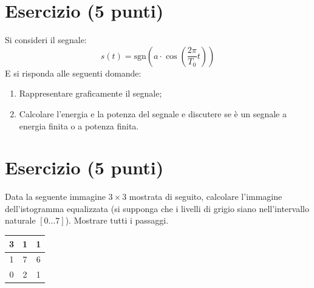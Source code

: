 \documentclass[a4paper]{article}
\begin{document}
	\section{Esercizio (5 punti)}
	
	Si consideri il segnale:
	\begin{equation*}
		s\left(t\right) = \mathrm{sgn}\left(a \cdot \cos\left(\dfrac{2\pi}{T_{0}}t\right)\right)
	\end{equation*}
	E si risponda alle seguenti domande:
	\begin{enumerate}
		\item Rappresentare graficamente il segnale;
		\item Calcolare l'energia e la potenza del segnale e discutere se è un segnale a energia finita o a potenza finita.
	\end{enumerate}
	
	\section{Esercizio (5 punti)}
	
	Data la seguente immagine $3 \times 3$ mostrata di seguito, calcolare l'immagine dell'istogramma equalizzata (si supponga che i livelli di grigio siano nell'intervallo naturale $\left[0...7\right]$). Mostrare tutti i passaggi.
	\begin{center}
		\begin{tabular}{| c | c | c |}
			\hline
			3 & 1 & 1 \\
			\hline
			1 & 7 & 6 \\
			\hline
			0 & 2 & 1 \\
			\hline
		\end{tabular}
	\end{center}
\end{document}
